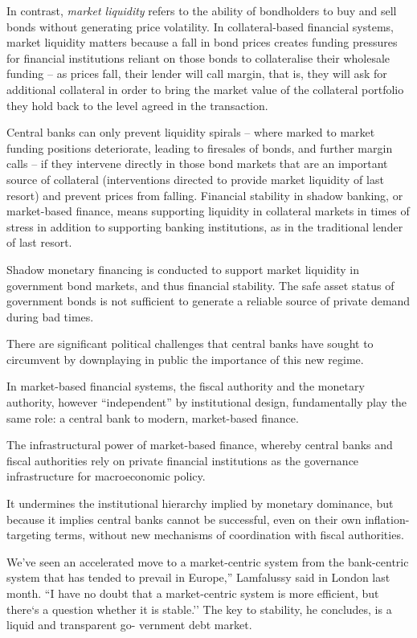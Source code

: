 \documentclass[
]{book}
\begin{document}
In contrast, \emph{market liquidity} refers to the ability of bondholders to
buy and sell bonds without generating price volatility.
In collateral-based financial systems, market liquidity matters because a fall in bond prices
creates funding pressures for financial institutions reliant on those bonds to collateralise
their wholesale funding -- as prices fall, their lender will call margin, that is,
they will ask for additional collateral in order to bring the market value of the collateral
portfolio they hold back to the level agreed in the transaction.

Central banks can only prevent liquidity spirals -- where marked to market
funding positions deteriorate, leading to firesales of bonds, and further margin calls --
if they intervene directly in those bond markets that are an important source of collateral
(interventions directed to provide market liquidity of last resort)
and prevent prices from falling.
Financial stability in shadow banking, or market-based finance, means supporting liquidity in
collateral markets in times of stress in addition to supporting banking institutions,
as in the traditional lender of last resort.

Shadow monetary financing is conducted to support market
liquidity in government bond markets, and thus financial stability. The safe asset status of
government bonds is not sufficient to generate a reliable source of private demand during
bad times.

There are significant political challenges that
central banks have sought to circumvent by downplaying in public the importance of this
new regime.

In market-based financial systems, the fiscal authority and the
monetary authority, however ``independent'' by institutional design, fundamentally play the
same role: a central bank to modern, market-based finance.

The infrastructural power of market-based finance,
whereby central banks and fiscal authorities rely on
private financial institutions as the governance infrastructure
for macroeconomic policy.

It undermines the institutional hierarchy implied by monetary dominance,
but because it implies central banks cannot be successful,
even on their own inflation-targeting terms,
without new mechanisms of coordination with fiscal authorities.

We've seen an accelerated move to a market-centric system from the bank-centric
system that has tended to prevail in Europe,'' Lamfalussy said in London last month.
``I have no doubt that a market-centric system is more efficient, but there`s a question
whether it is stable.'' The key to stability, he concludes, is a liquid and transparent go-
vernment debt market.
\end{document}
